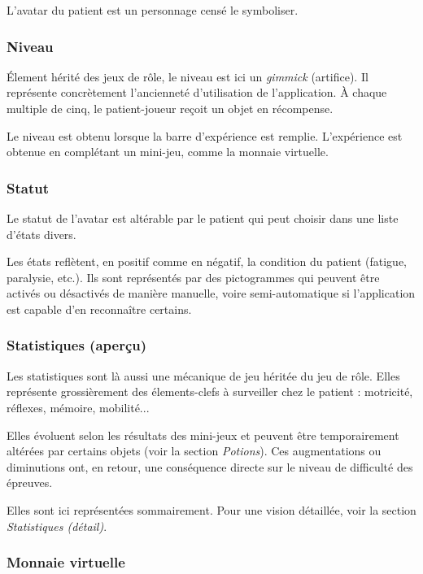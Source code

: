\documentclass[a4paper,12pt,francais]{article}
\begin{document}
L'avatar du patient est un personnage censé le symboliser.

\subsubsection{Niveau}

Élement hérité des jeux de rôle, le niveau est ici un \emph{gimmick} (artifice). Il représente concrètement l'ancienneté d'utilisation de l'application. À chaque multiple de cinq, le patient-joueur reçoit un objet en récompense.

Le niveau est obtenu lorsque la barre d'expérience est remplie. L'expérience est obtenue en complétant un mini-jeu, comme la monnaie virtuelle.

\subsubsection{Statut}

Le statut de l'avatar est altérable par le patient qui peut choisir dans une liste d'états divers.

Les états reflètent, en positif comme en négatif, la condition du patient (fatigue, paralysie, etc.). Ils sont représentés par des pictogrammes qui peuvent être activés ou désactivés de manière manuelle, voire semi-automatique si l'application est capable d'en reconnaître certains.

\subsubsection{Statistiques (aperçu)}

Les statistiques sont là aussi une mécanique de jeu héritée du jeu de rôle. Elles représente grossièrement des élements-clefs à surveiller chez le patient : motricité, réflexes, mémoire, mobilité...

Elles évoluent selon les résultats des mini-jeux et peuvent être temporairement altérées par certains objets (voir la section \emph{Potions}). Ces augmentations ou diminutions ont, en retour, une conséquence directe sur le niveau de difficulté des épreuves.

Elles sont ici représentées sommairement. Pour une vision détaillée, voir la section \emph{Statistiques (détail)}.

\subsubsection{Monnaie virtuelle}
\end{document}
